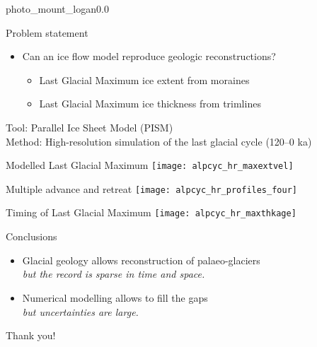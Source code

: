     \begin{backgroundframe}[b]{photo_mount_logan}{0.0}{}
    \end{backgroundframe}

    \begin{sectionframe}{Problem statement}
      \begin{itemize}
        \item Can an ice flow model reproduce geologic reconstructions?
          \begin{itemize}
            \item Last Glacial Maximum ice \alert{extent} from moraines
            \item Last Glacial Maximum ice \alert{thickness} from trimlines
          \end{itemize}
      \end{itemize}
      \bigskip\bigskip\bigskip\pause
      Tool: Parallel Ice Sheet Model (PISM)\\
      \bigskip
      Method: High-resolution simulation of the last glacial cycle (120--0 ka)
    \end{sectionframe}

    \begin{frame}{Modelled Last Glacial Maximum}
      \texttt{[image: alpcyc\_hr\_maxextvel]}
    \end{frame}

    \begin{frame}{Multiple advance and retreat}
      \texttt{[image: alpcyc\_hr\_profiles\_four]}
    \end{frame}

    \begin{frame}{Timing of Last Glacial Maximum}
      \texttt{[image: alpcyc\_hr\_maxthkage]}
    \end{frame}

    \begin{sectionframe}{Conclusions}
      \begin{itemize}
        \item Glacial geology allows reconstruction of palaeo-glaciers\\
          \emph{\small but the record is sparse in time and space.}
        \pause\bigskip
        \item Numerical modelling allows to fill the gaps\\
          \emph{\small but uncertainties are large.}
      \end{itemize}
    \end{sectionframe}

    \begin{sectionframe}{Thank you!}
    \end{sectionframe}



